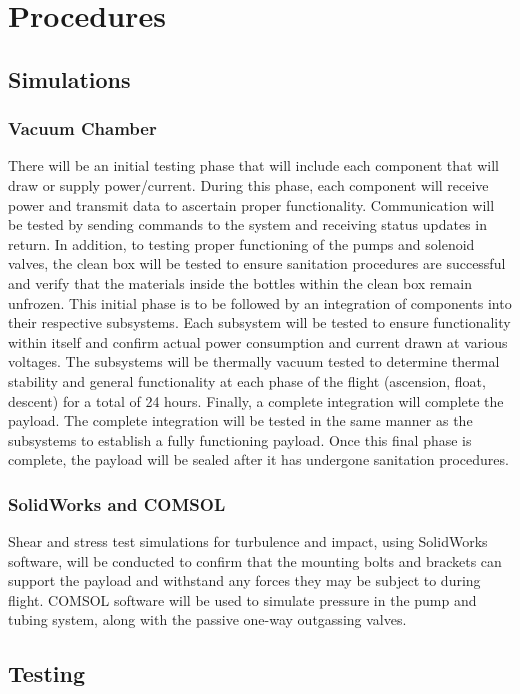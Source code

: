 \section{Procedures}
\label{sec:Procedures}

\subsection{Simulations}

\subsubsection{Vacuum Chamber}
There will be an initial testing phase that will include each component that will draw or supply power/current. During this phase, each component will receive power and transmit data to ascertain proper functionality.  Communication will be tested by sending commands to the system and receiving status updates in return. In addition, to testing proper functioning of the pumps and solenoid valves, the clean box will be tested to ensure sanitation procedures are successful and verify that the materials inside the bottles within the clean box remain unfrozen. This initial phase is to be followed by an integration of components into their respective subsystems. Each subsystem will be tested to ensure functionality within itself and confirm actual power consumption and current drawn at various voltages. The subsystems will be thermally vacuum tested to determine thermal stability and general functionality at each phase of the flight (ascension, float, descent) for a total of 24 hours. Finally, a complete integration will complete the payload. The complete integration will be tested in the same manner as the subsystems to establish a fully functioning payload. Once this final phase is complete, the payload will be sealed after it has undergone sanitation procedures.

\subsubsection{SolidWorks and COMSOL}
Shear and stress test simulations for turbulence and impact, using SolidWorks software, will be conducted to confirm that the mounting bolts and brackets can support the payload and withstand any forces they may be subject to during flight. COMSOL software will be used to simulate pressure in the pump and tubing system, along with the passive one-way outgassing valves.

\subsection{Testing}

